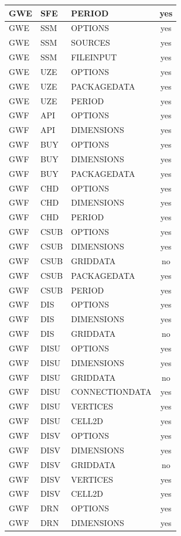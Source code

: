 \begin{longtable}{p{1.5cm} p{1.5cm} p{3cm} c}
GWE & SFE & PERIOD & yes \\ 
\hline
GWE & SSM & OPTIONS & yes \\ 
GWE & SSM & SOURCES & yes \\ 
GWE & SSM & FILEINPUT & yes \\ 
\hline
GWE & UZE & OPTIONS & yes \\ 
GWE & UZE & PACKAGEDATA & yes \\ 
GWE & UZE & PERIOD & yes \\ 
\hline
GWF & API & OPTIONS & yes \\ 
GWF & API & DIMENSIONS & yes \\ 
\hline
GWF & BUY & OPTIONS & yes \\ 
GWF & BUY & DIMENSIONS & yes \\ 
GWF & BUY & PACKAGEDATA & yes \\ 
\hline
GWF & CHD & OPTIONS & yes \\ 
GWF & CHD & DIMENSIONS & yes \\ 
GWF & CHD & PERIOD & yes \\ 
\hline
GWF & CSUB & OPTIONS & yes \\ 
GWF & CSUB & DIMENSIONS & yes \\ 
GWF & CSUB & GRIDDATA & no \\ 
GWF & CSUB & PACKAGEDATA & yes \\ 
GWF & CSUB & PERIOD & yes \\ 
\hline
GWF & DIS & OPTIONS & yes \\ 
GWF & DIS & DIMENSIONS & yes \\ 
GWF & DIS & GRIDDATA & no \\ 
\hline
GWF & DISU & OPTIONS & yes \\ 
GWF & DISU & DIMENSIONS & yes \\ 
GWF & DISU & GRIDDATA & no \\ 
GWF & DISU & CONNECTIONDATA & yes \\ 
GWF & DISU & VERTICES & yes \\ 
GWF & DISU & CELL2D & yes \\ 
\hline
GWF & DISV & OPTIONS & yes \\ 
GWF & DISV & DIMENSIONS & yes \\ 
GWF & DISV & GRIDDATA & no \\ 
GWF & DISV & VERTICES & yes \\ 
GWF & DISV & CELL2D & yes \\ 
\hline
GWF & DRN & OPTIONS & yes \\ 
GWF & DRN & DIMENSIONS & yes \\ 

\end{longtable}
